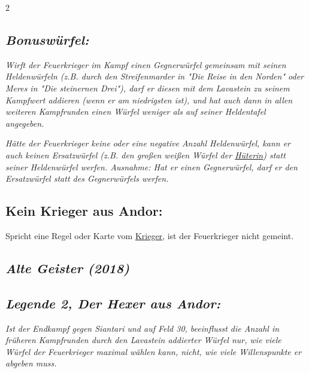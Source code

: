 \documentclass[10pt, a4paper, oneside]{book}
\newcommand{\fan}[1]{\textit{#1}}
\begin{document}
\begin{multicols*}{2}
\begin{nobgcolor}
\subsection{\fan{Bonuswürfel:}}

\fan{Wirft der Feuerkrieger im Kampf einen Gegnerwürfel gemeinsam mit seinen Heldenwürfeln (z.B. durch den Streifenmarder in "Die Reise in den Norden" oder Meres in "Die steinernen Drei"), darf er diesen mit dem Lavastein zu seinem Kampfwert addieren (wenn er am niedrigsten ist), und hat auch dann in allen weiteren Kampfrunden einen Würfel weniger als auf seiner Heldentafel angegeben.}

\fan{Hätte der Feuerkrieger keine oder eine negative Anzahl Heldenwürfel, kann er auch keinen Ersatzwürfel (z.B. den großen weißen Würfel der \hyperref[Hüterin]{Hüterin}) statt seiner Heldenwürfel werfen. Ausnahme: Hat er einen Gegnerwürfel, darf er den Ersatzwürfel statt des Gegnerwürfels werfen.}









\subsection{Kein Krieger aus Andor:}

Spricht eine Regel oder Karte vom \hyperref[Krieger]{Krieger}, ist der Feuerkrieger nicht gemeint.

\end{nobgcolor}




\columnbreak

\begin{bgcolor}[color-AG]
\section{\fan{Alte Geister (2018)}}

\subsection{\fan{Legende 2, Der Hexer aus Andor:}}

\fan{Ist der Endkampf gegen Siantari und auf Feld 30, beeinflusst die Anzahl in früheren Kampfrunden durch den Lavastein addierter Würfel nur, wie viele Würfel der Feuerkrieger maximal wählen kann, nicht, wie viele Willenspunkte er abgeben muss.}


\end{bgcolor}






\end{multicols*}
\end{document}
